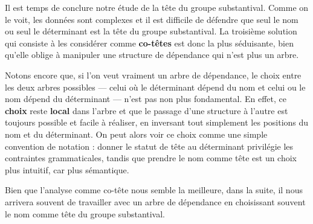 Il est temps de conclure notre étude de la tête du groupe substantival. Comme on le voit, les données sont complexes et il est difficile de défendre que seul le nom ou seul le déterminant est la tête du groupe substantival. La troisième solution qui consiste à les considérer comme \textbf{co-têtes} est donc la plus séduisante, bien qu’elle oblige à manipuler une structure de dépendance qui n’est plus un arbre.

Notons encore que, si l’on veut vraiment un arbre de dépendance, le choix entre les deux arbres possibles — celui où le déterminant dépend du nom et celui ou le nom dépend du déterminant — n’est pas non plus fondamental. En effet, ce \textbf{choix} reste \textbf{local} dans l’arbre et que le passage d’une structure à l’autre est toujours possible et facile à réaliser, en inversant tout simplement les positions du nom et du déterminant. On peut alors voir ce choix comme une simple convention de notation : donner le statut de tête au déterminant privilégie les contraintes grammaticales, tandis que prendre le nom comme tête est un choix plus intuitif, car plus sémantique.

Bien que l’analyse comme co-tête nous semble la meilleure, dans la suite, il nous arrivera souvent de travailler avec un arbre de dépendance en choisissant souvent le nom comme tête du groupe substantival.


